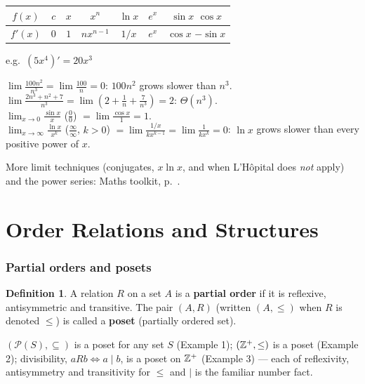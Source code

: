 \documentclass{fkt-notes}
\newcommand{\src}[1]{\par\noindent{\small\itshape Source: #1}\par\smallskip}
\newcommand{\kolman}[1]{\setcounter{section}{\numexpr#1-1\relax}}
\theoremstyle{definition}
\newtheorem*{defn}{Definition}
\begin{document}
\begin{rulepar}
  \begin{center}
    \begin{tabular}{@{}c|cccccc@{}}
      $f(x)$  & $c$ & $x$ & $x^n$      & $\ln x$ & $e^x$ & $\sin x$ \quad $\cos x$  \\\hline
      $f'(x)$ & $0$ & $1$ & $nx^{n-1}$ & $1/x$   & $e^x$ & $\cos x$ \quad $-\sin x$
    \end{tabular}
    \qquad e.g.\ $(5x^4)'=20x^3$
  \end{center}
\end{rulepar}

\begin{example}[limits]
  $\lim\frac{100n^2}{n^3}=\lim\frac{100}n=0$: $100n^2$ grows slower than $n^3$.\\
  $\lim\frac{2n^3+n^2+7}{n^3}=\lim\left(2+\frac1n+\frac7{n^3}\right)=2$:
  $\Theta(n^3)$.\\
  $\lim_{x\to0}\frac{\sin x}x$ ($\frac00$) $=\lim\frac{\cos x}1=1$.\\
  $\lim_{x\to\infty}\frac{\ln x}{x^k}$ ($\frac\infty\infty$, $k>0$)
  $=\lim\frac{1/x}{kx^{k-1}}=\lim\frac1{kx^k}=0$: $\ln x$ grows slower
  than every positive power of $x$.
\end{example}

\noindent More limit techniques (conjugates, $x\ln x$, and when L'Hôpital
does \emph{not} apply) and the power series: Maths toolkit,
p.~\pageref{qg:limits}.

\newpage
\part{Order Relations and Structures}

\kolman{1}
\section{Partial orders and posets}\src{Kolman 6.1}
%

\begin{defn}
  A relation $R$ on a set $A$ is a \textbf{partial order} if it is
  reflexive, antisymmetric and transitive. The pair $(A,R)$ (written
  $(A,\le)$ when $R$ is denoted $\le$) is called a \textbf{poset}
  (partially ordered set).
\end{defn}

\begin{example}[6.1 Ex.~1--3]
  $(\mathcal P(S),\subseteq)$ is a poset for any set $S$ (Example 1);
  $(\mathbb{Z}^{+},\le)$ is a poset (Example 2); divisibility, $aRb\iff a\mid b$,
  is a poset on $\mathbb{Z}^{+}$ (Example 3) --- each of reflexivity,
  antisymmetry and transitivity for $\le$ and $\mid$ is the familiar
  number fact.
\end{example}
\end{document}
